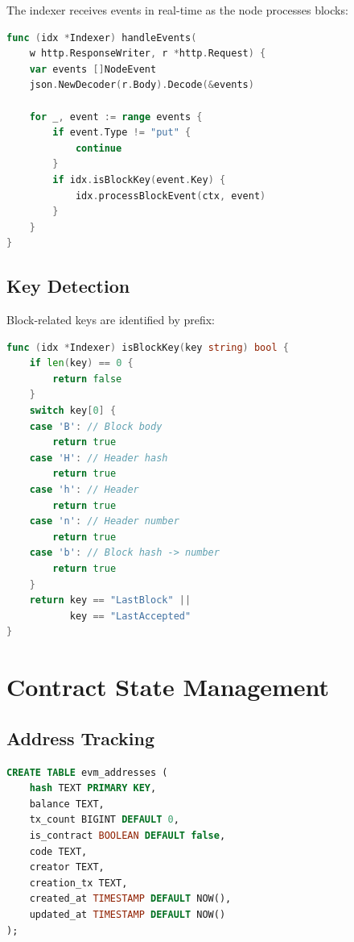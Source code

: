 \documentclass[11pt,twocolumn]{article}
\begin{document}
The indexer receives events in real-time as the node processes blocks:

\begin{lstlisting}[language=Go,caption={Event handling}]
func (idx *Indexer) handleEvents(
    w http.ResponseWriter, r *http.Request) {
    var events []NodeEvent
    json.NewDecoder(r.Body).Decode(&events)

    for _, event := range events {
        if event.Type != "put" {
            continue
        }
        if idx.isBlockKey(event.Key) {
            idx.processBlockEvent(ctx, event)
        }
    }
}
\end{lstlisting}

\subsection{Key Detection}

Block-related keys are identified by prefix:

\begin{lstlisting}[language=Go,caption={Block key detection}]
func (idx *Indexer) isBlockKey(key string) bool {
    if len(key) == 0 {
        return false
    }
    switch key[0] {
    case 'B': // Block body
        return true
    case 'H': // Header hash
        return true
    case 'h': // Header
        return true
    case 'n': // Header number
        return true
    case 'b': // Block hash -> number
        return true
    }
    return key == "LastBlock" ||
           key == "LastAccepted"
}
\end{lstlisting}

\section{Contract State Management}

\subsection{Address Tracking}

\begin{lstlisting}[language=SQL,caption={Address schema}]
CREATE TABLE evm_addresses (
    hash TEXT PRIMARY KEY,
    balance TEXT,
    tx_count BIGINT DEFAULT 0,
    is_contract BOOLEAN DEFAULT false,
    code TEXT,
    creator TEXT,
    creation_tx TEXT,
    created_at TIMESTAMP DEFAULT NOW(),
    updated_at TIMESTAMP DEFAULT NOW()
);
\end{lstlisting}
\end{document}
